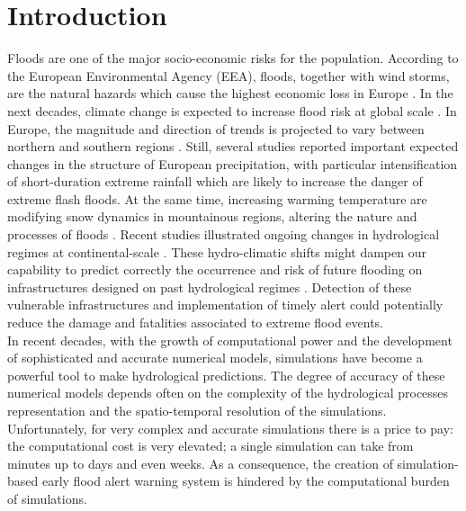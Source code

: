 \chapter{Introduction}
\label{chp:introduction}

\newcommand{\keyword}[1]{\textbf{#1}}
\newcommand{\tabhead}[1]{\textbf{#1}}
\newcommand{\code}[1]{\texttt{#1}}
\newcommand{\file}[1]{\texttt{\bfseries#1}}
\newcommand{\option}[1]{\texttt{\itshape#1}}


Floods are one of the major socio-economic risks for the population. According to the European Environmental Agency (EEA), floods, together with wind storms, are the natural hazards which cause the highest economic loss  
in Europe \autocite{european_environment_agency_flood_2013}.
In the next decades, climate change is expected to increase flood risk at global scale \autocite{milly_increasing_2002,hirabayashi_global_2008,hirabayashi_global_2013}. In Europe, the magnitude and direction of trends is projected to vary between northern and southern regions \autocite{dankers_flood_2009,alfieri_global_2015, thober_multi-model_2018}. Still, several studies reported important expected changes in the structure of European precipitation, with particular intensification of short-duration extreme rainfall \autocite{christensen_intensification_2004,zolina_changing_2010,westra_global_2013} which are likely to increase the danger of extreme flash floods. 
At the same time, increasing warming temperature are modifying snow dynamics in mountainous regions, altering the nature and processes of floods \autocite{koplin_seasonality_2014,hall_understanding_2014,berghuijs_precipitation_2014}. 
Recent studies illustrated ongoing changes in hydrological regimes at continental-scale \autocite{bloschl_changing_2017,stahl_filling_2012}.
These hydro-climatic shifts might dampen our capability to predict correctly the occurrence and risk of future flooding on infrastructures designed on past hydrological regimes \autocite{milly_increasing_2002}.
Detection of these vulnerable infrastructures and implementation of timely alert could potentially reduce the damage and fatalities associated to extreme flood events.\\
 
In recent decades, with the growth of computational power and the development of sophisticated and accurate numerical models, simulations have become a powerful tool to make hydrological predictions. 
The degree of accuracy of these numerical models depends often on the complexity of the hydrological processes representation and the spatio-temporal resolution of the simulations. Unfortunately, for very complex and accurate simulations there is a price to pay: the computational cost is very elevated; a single simulation can take from  minutes up to days and even weeks. As a consequence, the creation of simulation-based early flood alert warning system is hindered by the computational burden of simulations. 

